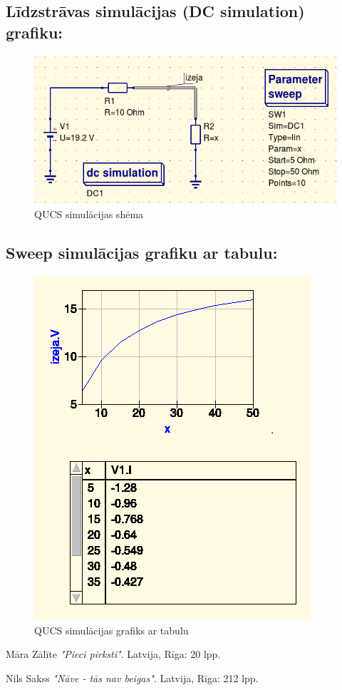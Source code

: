 \documentclass{report}
\begin{document}
    \subsection{Līdzstrāvas simulācijas (DC simulation) grafiku:}
        \begin{figure}[h]
            \centering
            \includegraphics[width=.5\textwidth]{Lab.d/data/SHEMA.png}                \caption{QUCS simulācijas shēma}
            \label{fig:my_label5}
        \end{figure}

    \subsection{Sweep simulācijas grafiku ar tabulu:}
        \begin{figure}[h]
            \centering
            \includegraphics[width=.5\textwidth]{Lab.d/data/QUCS_TAB_GRAF.png}
            \caption{QUCS simulācijas grafiks ar tabulu}
            \label{fig:my_label6}
        \end{figure}    

\begin{thebibliography}{9}
        Māra Zālīte 
    \textit{"Pieci pirksti"}. 
        Latvija, Rīga: 20 lpp.

        Nils Sakss  
    \textit{"Nāve - tās nav beigas"}. 
        Latvija, Rīga: 212 lpp.
\end{thebibliography}        
    
    
\end{document}
